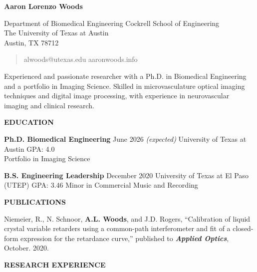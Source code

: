 \documentclass[
]{article}
\author{}
\date{}
\begin{document}
\textbf{Aaron Lorenzo Woods}

Department of Biomedical Engineering Cockrell School of Engineering\\
The University of Texas at Austin\\
Austin, TX 78712

\begin{quote}
alwoods@utexas.edu \textbar{} aaronwoods.info
\end{quote}

Experienced and passionate researcher with a Ph.D. in Biomedical
Engineering and a portfolio in Imaging Science. Skilled in
microvasculature optical imaging techniques and digital image
processing, with experience in neurovascular imaging and clinical
research.

\textbf{EDUCATION}

\textbf{Ph.D. Biomedical Engineering} June 2026 \emph{(expected)}
University of Texas at Austin GPA: 4.0\\
Portfolio in Imaging Science

\textbf{B.S. Engineering Leadership} December 2020 University of Texas
at El Paso (UTEP) GPA: 3.46 Minor in Commercial Music and Recording

\textbf{PUBLICATIONS}

Niemeier, R., N. Schnoor, \textbf{A.L. Woods}, and J.D. Rogers,
``Calibration of liquid crystal variable retarders using a common-path
interferometer and fit of a closed-form expression for the retardance
curve,'' published to \emph{\textbf{Applied Optics}}, October. 2020.

\textbf{RESEARCH EXPERIENCE}
\end{document}
